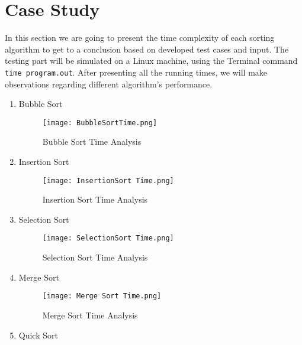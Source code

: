 \documentclass[11pt, letter paper]{article}
\begin{document}
        \section{Case Study}
        In this section we are going to present the time complexity of each sorting algorithm to get to a conclusion based on developed test cases and input. The testing part will be simulated on a Linux machine, using the Terminal command \texttt{time program.out}. After presenting all the running times, we will make observations regarding different algorithm's performance.
                        \newline
        \begin{enumerate}
            \item Bubble Sort
                \begin{figure}[h]
                    \centering
                    \texttt{[image: BubbleSortTime.png]}
                    \caption{Bubble Sort Time Analysis}
                    \label{fig:my_label}
                \end{figure}
                \newpage
                \item Insertion Sort
                \begin{figure}[h!]
                    \centering
                    \texttt{[image: InsertionSort Time.png]}
                    \caption{Insertion Sort Time Analysis}
                    \label{fig:my_label}
                \end{figure}
                \item Selection Sort
                \begin{figure}[h!]
                    \centering
                    \texttt{[image: SelectionSort Time.png]}
                    \caption{Selection Sort Time Analysis}
                    \label{fig:my_label}
                \end{figure}
                \item Merge Sort
                \begin{figure}[h!]
                    \centering
                    \texttt{[image: Merge Sort Time.png]}
                    \caption{Merge Sort Time Analysis}
                    \label{fig:my_label}
                \end{figure}
                \item Quick Sort
                \begin{figure}[h!]
                    \centering

\end{figure}
\end{enumerate}
\end{document}
